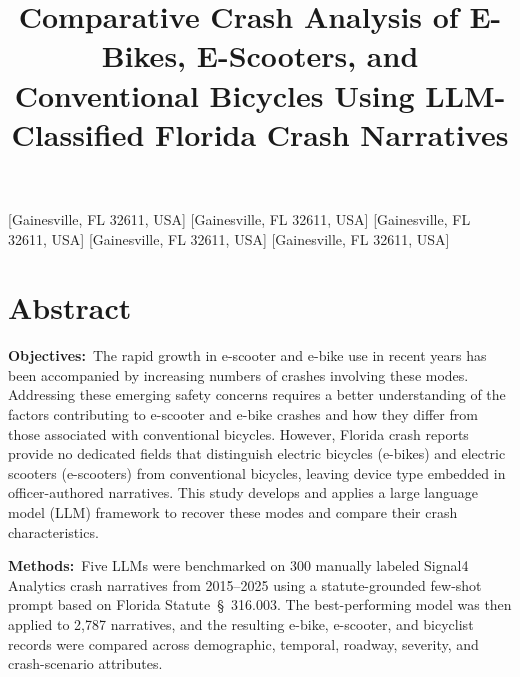 \documentclass[numbered]{trbunofficial}
\begin{document}
\title{Comparative Crash Analysis of E-Bikes, E-Scooters, and Conventional Bicycles Using LLM-Classified Florida Crash Narratives}

[Gainesville, FL 32611, USA]
[Gainesville, FL 32611, USA]
[Gainesville, FL 32611, USA]
[Gainesville, FL 32611, USA]
[Gainesville, FL 32611, USA]


\maketitle

\section{Abstract}

\noindent\textbf{Objectives:}~The rapid growth in e-scooter and e-bike use in recent years has been accompanied by increasing numbers of crashes involving these modes. Addressing these emerging safety concerns requires a better understanding of the factors contributing to e-scooter and e-bike crashes and how they differ from those associated with conventional bicycles. However, Florida crash reports provide no dedicated fields that distinguish electric bicycles (e-bikes) and electric scooters (e-scooters) from conventional bicycles, leaving device type embedded in officer-authored narratives. This study develops and applies a large language model (LLM) framework to recover these modes and compare their crash characteristics.

\hfill\break%
\noindent\textbf{Methods:}~Five LLMs were benchmarked on 300 manually labeled Signal4 Analytics crash narratives from 2015--2025 using a statute-grounded few-shot prompt based on Florida Statute~\S~316.003. The best-performing model was then applied to 2,787 narratives, and the resulting e-bike, e-scooter, and bicyclist records were compared across demographic, temporal, roadway, severity, and crash-scenario attributes.
\end{document}
